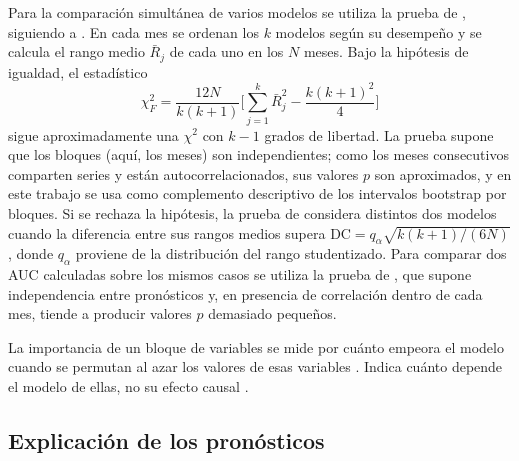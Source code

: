 Para la comparación simultánea de varios modelos se utiliza la prueba de \citet{friedman1937}, siguiendo a \citet{demsar2006}. En cada mes se ordenan los $k$ modelos según su desempeño y se calcula el rango medio $\bar R_j$ de cada uno en los $N$ meses. Bajo la hipótesis de igualdad, el estadístico
\begin{equation}
\chi^2_F=\frac{12N}{k(k+1)}\Big[\sum_{j=1}^{k}\bar R_j^2-\frac{k(k+1)^2}{4}\Big]
\end{equation}
sigue aproximadamente una $\chi^2$ con $k-1$ grados de libertad. La prueba supone que los bloques (aquí, los meses) son independientes; como los meses consecutivos comparten series y están autocorrelacionados, sus valores $p$ son aproximados, y en este trabajo se usa como complemento descriptivo de los intervalos bootstrap por bloques. Si se rechaza la hipótesis, la prueba de \citet{nemenyi1963} considera distintos dos modelos cuando la diferencia entre sus rangos medios supera $\mathrm{DC}=q_\alpha\sqrt{k(k+1)/(6N)}$, donde $q_\alpha$ proviene de la distribución del rango studentizado. Para comparar dos AUC calculadas sobre los mismos casos se utiliza la prueba de \citet{delong1988}, que supone independencia entre pronósticos y, en presencia de correlación dentro de cada mes, tiende a producir valores $p$ demasiado pequeños.

La importancia de un bloque de variables se mide por cuánto empeora el modelo cuando se permutan al azar los valores de esas variables \citep{breiman2001,fisher2019}. Indica cuánto depende el modelo de ellas, no su efecto causal \citep{hooker2021}.

\subsection{Explicación de los pronósticos}
\label{sec:shap}

